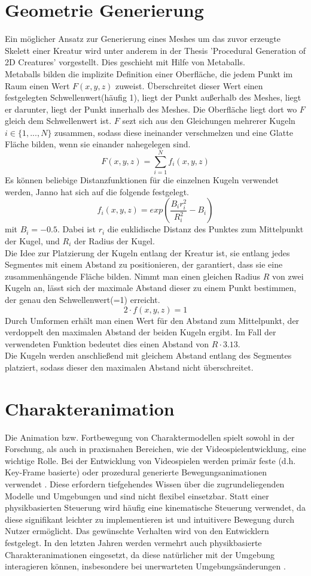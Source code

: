 \section{Geometrie Generierung}
Ein möglicher Ansatz zur Generierung eines Meshes um das zuvor erzeugte Skelett einer Kreatur wird unter anderem in der Thesis 'Procedural Generation of 2D Creatures' \cite{Janno20182dCG} vorgestellt. Dies geschieht mit Hilfe von Metaballs.\\
Metaballs bilden die implizite Definition einer Oberfläche, die jedem Punkt im Raum einen Wert $F(x,y,z)$ zuweist. Überschreitet dieser Wert einen festgelegten Schwellenwert(häufig 1), liegt der Punkt außerhalb des Meshes, liegt er darunter, liegt der Punkt innerhalb des Meshes. Die Oberfläche liegt dort wo $F$ gleich dem Schwellenwert ist. $F$ sezt sich aus den Gleichungen mehrerer Kugeln $i\in \{ 1, ..., N\}$ zusammen, sodass diese ineinander verschmelzen und eine Glatte Fläche bilden, wenn sie einander nahegelegen sind.
\[F(x,y,z) = \sum_{i=1}^{N}{f_i(x,y,z)}\]
Es können beliebige Distanzfunktionen für die einzelnen Kugeln verwendet werden, Janno hat sich auf die folgende festgelegt.
\[f_i(x,y,z)=exp(\frac{B_ir_i^2}{R_i^2}-B_i)\]
mit $B_i=-0.5$. Dabei ist $r_i$ die euklidische Distanz des Punktes zum Mittelpunkt der Kugel, und $R_i$ der Radius der Kugel.\\
Die Idee zur Platzierung der Kugeln entlang der Kreatur ist, sie entlang jedes Segmentes mit einem Abstand zu positionieren, der garantiert, dass sie eine zusammenhängende Fläche bilden. Nimmt man einen gleichen Radius $R$ von zwei Kugeln an, lässt sich der maximale Abstand dieser zu einem Punkt bestimmen, der genau den Schwellenwert(=1) erreicht.
\[2\cdot f(x,y,z) = 1\]
Durch Umformen erhält man einen Wert für den Abstand zum Mittelpunkt, der verdoppelt den maximalen Abstand der beiden Kugeln ergibt. Im Fall der verwendeten Funktion bedeutet dies einen Abstand von $R \cdot 3.13$.\\
Die Kugeln werden anschließend mit gleichem Abstand entlang des Segmentes platziert, sodass dieser den maximalen Abstand nicht überschreitet.

\section{Charakteranimation}
Die Animation bzw. Fortbewegung von Charaktermodellen spielt sowohl in der Forschung, als auch in praxisnahen Bereichen, wie der Videospielentwicklung, eine wichtige Rolle.
Bei der Entwicklung von Videospielen werden primär feste (d.h. Key-Frame basierte) oder prozedural generierte Bewegungsanimationen verwendet \cite{keyframe_animation}. Diese erfordern tiefgehendes Wissen über die zugrundeliegenden Modelle und Umgebungen und sind nicht flexibel einsetzbar. Statt einer physikbasierten Steuerung wird häufig eine kinematische Steuerung verwendet, da diese signifikant leichter zu implementieren ist und intuitivere Bewegung durch Nutzer ermöglicht. Das gewünschte Verhalten wird von den Entwicklern festgelegt. In den letzten Jahren werden vermehrt auch physikbasierte Charakteranimationen eingesetzt, da diese natürlicher mit der Umgebung interagieren können, insbesondere bei unerwarteten Umgebungsänderungen \cite{Geijtenbeek2012}.

